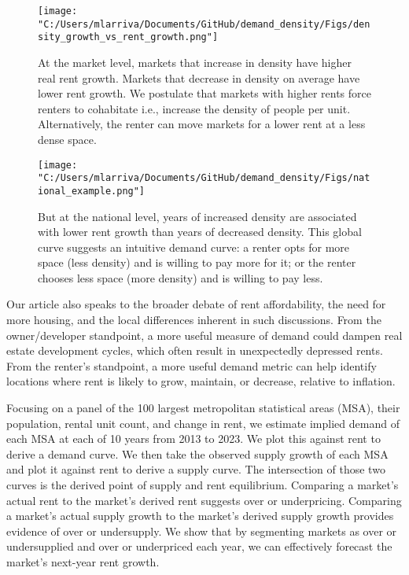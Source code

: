 \documentclass[sn-mathphys-num]{sn-jnl}%
\theoremstyle{thmstyleone}%
\theoremstyle{thmstyletwo}%
\theoremstyle{thmstylethree}%
\begin{document}
\begin{figure}[H]
	\centering
	\texttt{[image: "C:/Users/mlarriva/Documents/GitHub/demand\_density/Figs/density\_growth\_vs\_rent\_growth.png"]}
	\caption{At the market level, markets that increase in density have higher real rent growth. Markets that decrease in density on average have lower rent growth. We postulate that markets with higher rents force renters to cohabitate i.e., increase the density of people per unit. Alternatively, the renter can move markets for a lower rent at a less dense space.}\label{fig1}
\end{figure}

\begin{figure}[H]
	\centering
	\texttt{[image: "C:/Users/mlarriva/Documents/GitHub/demand\_density/Figs/national\_example.png"]}
	\caption{But at the national level, years of increased density are associated with lower rent growth than years of decreased density. This global curve suggests an intuitive demand curve: a renter opts for more space (less density) and is willing to pay more for it; or the renter chooses less space (more density) and is willing to pay less.}\label{fig4}
\end{figure}

Our article also speaks to the broader debate of rent affordability, the need for more housing, and the local differences inherent in such discussions. From the owner/developer standpoint, a more useful measure of demand could dampen real estate development cycles, which often result in unexpectedly depressed rents. From the renter's standpoint, a more useful demand metric can help identify locations where rent is likely to grow, maintain, or decrease, relative to inflation.  

Focusing on a panel of the 100 largest metropolitan statistical areas (MSA), their population, rental unit count, and change in rent, we estimate implied demand of each MSA at each of 10 years from 2013 to 2023. We plot this against rent to derive a demand curve. We then take the observed supply growth of each MSA and plot it against rent to derive a supply curve. The intersection of those two curves is the derived point of supply and rent equilibrium. Comparing a market's actual rent to the market's derived rent suggests over or underpricing. Comparing a market's actual supply growth to the market's derived supply growth provides evidence of over or undersupply. We show that by segmenting markets as over or undersupplied and over or underpriced each year, we can effectively forecast the market's next-year rent growth.  
\end{document}
